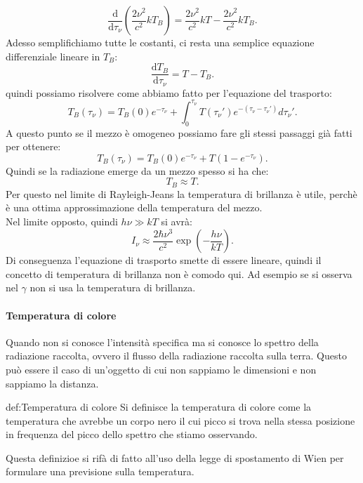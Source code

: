 \[
	\frac{\mbox{d} }{\mbox{d} \tau _{\nu} }\left( \frac{2\nu ^2}{c^2}kT_{B} \right) = \frac{2\nu ^2}{c^2}kT -  \frac{2\nu ^2}{c^2}kT_{B} 
.\] 
Adesso semplifichiamo tutte le costanti, ci resta una semplice equazione differenziale lineare in $T_{B}$:
\[
	\frac{\mbox{d} T_{B}}{\mbox{d} \tau _{\nu} } = T -T_{B}
.\] 
quindi possiamo risolvere come abbiamo fatto per l'equazione del trasporto:
\[
	T_{B}( \tau _{\nu} ) = T_{B}( 0) e^{-\tau _{\nu} } + \int_{0}^{\tau _{\nu} } T( \tau _{\nu} ')e^{-\left( \tau _{\nu} -\tau _{\nu} ' \right) } d\tau _{\nu} ' 
.\] 
A questo punto se il mezzo è omogeneo possiamo fare gli stessi passaggi già fatti per ottenere:
\[
	T_{B}( \tau _{\nu} ) = T_B( 0) e^{-\tau _{\nu}} + T \left( 1-e^{-\tau _{\nu} } \right) 
.\] 
Quindi se la radiazione emerge da un mezzo spesso si ha che:
\[
	T_{B} \approx T
.\] 
Per questo nel limite di Rayleigh-Jeans la temperatura di brillanza è utile, perchè è una ottima approssimazione della temperatura del mezzo.\\
Nel limite opposto, quindi $h \nu \gg kT$ si avrà:
\[
	I_{\nu} \approx \frac{2\hbar \nu ^3}{c^2}\exp\left( - \frac{h \nu }{kT} \right) 
.\] 
Di conseguenza l'equazione di trasporto smette di essere lineare, quindi il concetto di temperatura di brillanza non è comodo qui. Ad esempio se si osserva nel $\gamma $ non si usa la temperatura di brillanza.
\paragraph{Temperatura di colore}
Quando non si conosce l'intensità specifica ma si conosce lo spettro della radiazione raccolta, ovvero il flusso della radiazione raccolta sulla terra.
Questo può essere il caso di un'oggetto di cui non sappiamo le dimensioni e non sappiamo la distanza.
\begin{defn}{def:Temperatura di colore}
	Si definisce la temperatura di colore come la temperatura che avrebbe un corpo nero il cui picco si trova nella stessa posizione in frequenza del picco dello spettro che stiamo osservando.
\end{defn}
Questa definizioe si rifà di fatto all'uso della legge di spostamento di Wien per formulare una previsione sulla temperatura.
